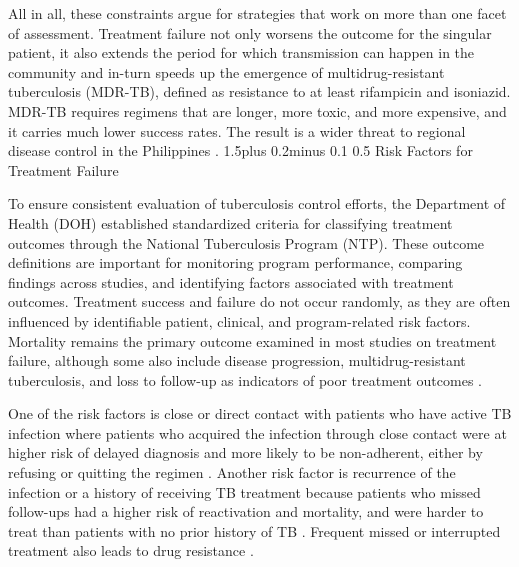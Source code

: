 \documentclass[12pt]{article}
\makeatletter
\renewcommand{\_}{\textunderscore\allowbreak}
\renewcommand{\subsection}{\@startsection{subsection}{2}{0pt}%
  {1.5\baselineskip plus 0.2\baselineskip minus 0.1\baselineskip}%
  {0.5\baselineskip}%
  {\bfseries\normalsize}}
\makeatother
\begin{document}
All in all, these constraints argue for strategies that work on more than one facet of assessment. Treatment failure not only worsens the outcome for the singular patient, it also extends the period for which transmission can happen in the community and in-turn speeds up the emergence of multidrug-resistant tuberculosis (MDR-TB), defined as resistance to at least rifampicin and isoniazid. MDR-TB requires regimens that are longer, more toxic, and more expensive, and it carries much lower success rates. The result is a wider threat to regional disease control in the Philippines \citep{ref28,ref35,ref36}.
\subsection{Risk Factors for Treatment Failure}

To ensure consistent evaluation of tuberculosis control efforts, the Department of Health (DOH) established standardized criteria for classifying treatment outcomes through the National Tuberculosis Program (NTP). These outcome definitions are important for monitoring program performance, comparing findings across studies, and identifying factors associated with treatment outcomes. Treatment success and failure do not occur randomly, as they are often influenced by identifiable patient, clinical, and program-related risk factors. Mortality remains the primary outcome examined in most studies on treatment failure, although some also include disease progression, multidrug-resistant tuberculosis, and loss to follow-up as indicators of poor treatment outcomes \citep{ref6}.

One of the risk factors is close or direct contact with patients who have active TB infection where patients who acquired the infection through close contact were at higher risk of delayed diagnosis and more likely to be non-adherent, either by refusing or quitting the regimen \citep{ref7}. Another risk factor is recurrence of the infection or a history of receiving TB treatment because patients who missed follow-ups had a higher risk of reactivation and mortality, and were harder to treat than patients with no prior history of TB \citep{ref21}. Frequent missed or interrupted treatment also leads to drug resistance \citep{ref13}.
\end{document}
